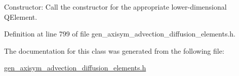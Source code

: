 Constructor\+: Call the constructor for the appropriate lower-\/dimensional Q\+Element. 



Definition at line 799 of file gen\+\_\+axisym\+\_\+advection\+\_\+diffusion\+\_\+elements.\+h.



The documentation for this class was generated from the following file\+:\begin{DoxyCompactItemize}
\item 
\hyperlink{gen__axisym__advection__diffusion__elements_8h}{gen\+\_\+axisym\+\_\+advection\+\_\+diffusion\+\_\+elements.\+h}\end{DoxyCompactItemize}
